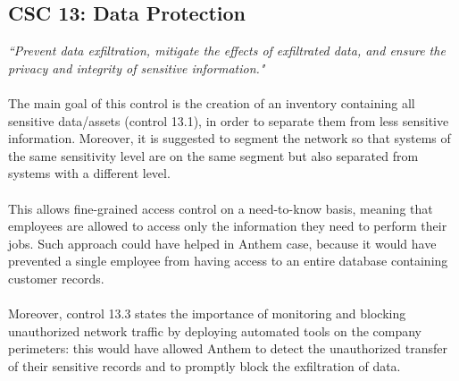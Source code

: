 	\subsection{CSC 13: Data Protection}
	\textit{``Prevent data exfiltration, mitigate the effects of exfiltrated data, and ensure the privacy and integrity of sensitive information."}\\\\
	The main goal of this control is the creation of an inventory containing all sensitive data/assets (control 13.1), in order to separate them from less sensitive information. Moreover, it is suggested to segment the network so that systems of the same sensitivity level are on the same segment but also separated from systems with a different level. \\\\This allows fine-grained access control on a need-to-know basis, meaning that employees are allowed to access only the information they need to perform their jobs. Such approach could have helped in Anthem case, because it would have prevented a single employee from having access to an entire database containing customer records.\\\\
	Moreover, control 13.3 states the importance of monitoring and blocking unauthorized network traffic by deploying automated tools on the company perimeters: this would have allowed Anthem to detect the unauthorized transfer of their sensitive records and to promptly block the exfiltration of data.
	\newpage
